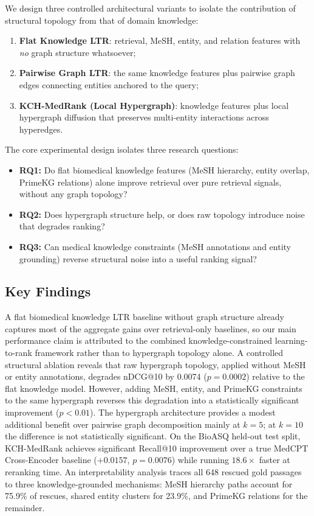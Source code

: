 We design three controlled architectural variants to isolate the contribution of structural topology from that of domain knowledge:
\begin{enumerate}[label=(\arabic*)]
  \item \textbf{Flat Knowledge LTR}: retrieval, MeSH, entity, and relation features with \textit{no} graph structure whatsoever;
  \item \textbf{Pairwise Graph LTR}: the same knowledge features plus pairwise graph edges connecting entities anchored to the query;
  \item \textbf{KCH-MedRank (Local Hypergraph)}: knowledge features plus local hypergraph diffusion that preserves multi-entity interactions across hyperedges.
\end{enumerate}
The core experimental design isolates three research questions:
\begin{itemize}
  \item \textbf{RQ1:} Do flat biomedical knowledge features (MeSH hierarchy, entity overlap, PrimeKG relations) alone improve retrieval over pure retrieval signals, without any graph topology?
  \item \textbf{RQ2:} Does hypergraph structure help, or does raw topology introduce noise that degrades ranking?
  \item \textbf{RQ3:} Can medical knowledge constraints (MeSH annotations and entity grounding) reverse structural noise into a useful ranking signal?
\end{itemize}

\subsection*{Key Findings}

A flat biomedical knowledge LTR baseline without graph structure already captures most of the aggregate gains over retrieval-only baselines, so our main performance claim is attributed to the combined knowledge-constrained learning-to-rank framework rather than to hypergraph topology alone. A controlled structural ablation reveals that raw hypergraph topology, applied without MeSH or entity annotations, degrades nDCG@10 by 0.0074 ($p = 0.0002$) relative to the flat knowledge model. However, adding MeSH, entity, and PrimeKG constraints to the same hypergraph reverses this degradation into a statistically significant improvement ($p < 0.01$). The hypergraph architecture provides a modest additional benefit over pairwise graph decomposition mainly at $k{=}5$; at $k{=}10$ the difference is not statistically significant. On the BioASQ held-out test split, KCH-MedRank achieves significant Recall@10 improvement over a true MedCPT Cross-Encoder baseline ($+0.0157$, $p=0.0076$) while running $18.6\times$ faster at reranking time. An interpretability analysis traces all 648 rescued gold passages to three knowledge-grounded mechanisms: MeSH hierarchy paths account for 75.9\% of rescues, shared entity clusters for 23.9\%, and PrimeKG relations for the remainder.

